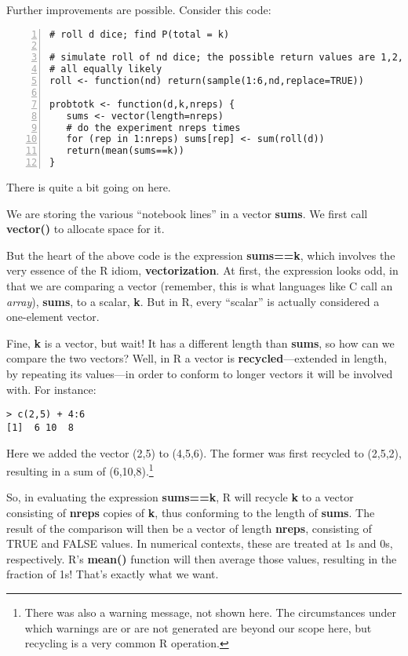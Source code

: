 Further improvements are possible.  Consider this code: 

\begin{Verbatim}[fontsize=\relsize{-2},numbers=left]
# roll d dice; find P(total = k)

# simulate roll of nd dice; the possible return values are 1,2,3,4,5,6,
# all equally likely
roll <- function(nd) return(sample(1:6,nd,replace=TRUE))

probtotk <- function(d,k,nreps) {
   sums <- vector(length=nreps)
   # do the experiment nreps times
   for (rep in 1:nreps) sums[rep] <- sum(roll(d))
   return(mean(sums==k))
}
\end{Verbatim}

There is quite a bit going on here.

We are storing the various ``notebook lines'' in a vector {\bf sums}.
We first call {\bf vector()} to allocate space for it.

But the heart of the above code is the expression {\bf sums==k}, which
involves the very essence of the R idiom, {\bf vectorization}.  At
first, the expression looks odd, in that we are comparing a vector
(remember, this is what languages like C call an {\it array}), {\bf
sums}, to a scalar, {\bf k}.  But in R, every ``scalar'' is actually
considered a one-element vector.  

Fine, {\bf k} is a vector, but wait!  It has a different length than
{\bf sums}, so how can we compare the two vectors?  Well, in R 
a vector is {\bf recycled}---extended in length, by repeating its
values---in order to conform to longer vectors it will be involved with.
For instance:

\begin{Verbatim}[fontsize=\relsize{-2}]
> c(2,5) + 4:6
[1]  6 10  8
\end{Verbatim}

Here we added the vector (2,5) to (4,5,6).  The former was first
recycled to (2,5,2), resulting in a sum of (6,10,8).\footnote{There was
also a warning message, not shown here.  The circumstances under which
warnings are or are not generated are beyond our scope here, but 
recycling is a very common R operation.}

So, in evaluating the expression {\bf sums==k}, R will recycle {\bf k}
to a vector consisting of {\bf nreps} copies of {\bf k}, thus conforming
to the length of {\bf sums}.  The result of the comparison will then be
a vector of length {\bf nreps}, consisting of TRUE and FALSE values.
In numerical contexts, these are treated at 1s and 0s, respectively.
R's {\bf mean()} function will then average those values, resulting in
the fraction of 1s!  That's exactly what we want.


